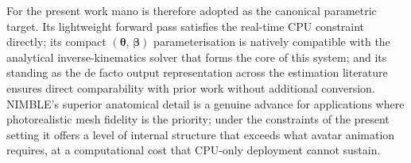 For the present work \acrshort{mano} is therefore adopted as the canonical
parametric target.
Its lightweight forward pass satisfies the real-time CPU constraint directly;
its compact $(\boldsymbol{\theta},\,\boldsymbol{\beta})$ parameterisation
is natively compatible with the analytical inverse-kinematics solver that
forms the core of this system; and its standing as the de facto output
representation across the estimation literature ensures direct comparability
with prior work without additional conversion.
NIMBLE's superior anatomical detail is a genuine advance for applications
where photorealistic mesh fidelity is the priority; under the constraints
of the present setting it offers a level of internal structure that exceeds
what avatar animation requires, at a computational cost that CPU-only
deployment cannot sustain.
